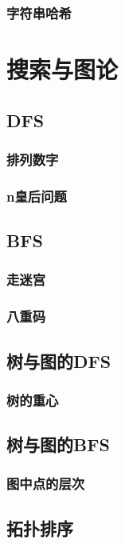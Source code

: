 \documentclass[10pt,a4paper]{article}
\begin{document}
\subsubsection{字符串哈希}

\section{搜索与图论}
\subsection{DFS}
\subsubsection{排列数字}

\subsubsection{n皇后问题}

\subsection{BFS}
\subsubsection{走迷宫}

\subsubsection{八重码}

\subsection{树与图的DFS}
\subsubsection{树的重心}

\subsection{树与图的BFS}
\subsubsection{图中点的层次}

\subsection{拓扑排序}
\end{document}
